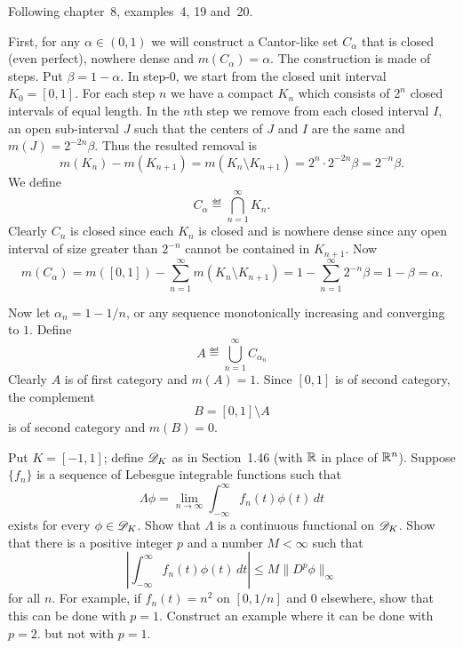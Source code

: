 \begin{enumerate}
Following \cite{Gelb1996} chapter~8, examples~4, 19 and~20.

First, for any \(\alpha\in(0,1)\)
we will construct a Cantor-like set \(C_\alpha\)
that is closed (even perfect), nowhere dense and \(m(C_\alpha)=\alpha\).
The construction is made of steps. 
Put \(\beta = 1 - \alpha\).
In step-$0$, 
we start from the closed unit interval \(K_0 = [0,1]\).
For each step $n$ we have a compact \(K_n\) which 
consists of \(2^n\) closed intervals of equal length.
In the $n$th step we remove from each closed interval $I$,
an open sub-interval $J$ such that the centers of $J$ and $I$ are the same
and \(m(J) = 2^{-2n}\beta\). Thus the resulted removal is
\begin{equation*}
m(K_n) - m(K_{n+1}) = m(K_n \setminus K_{n+1}) 
 = 2^n \cdot 2^{-2n}\beta = 2^{-n}\beta.
\end{equation*}
We define
\begin{equation*}
 C_\alpha \eqdef \bigcap_{n=1}^\infty K_n.
\end{equation*}
Clearly \(C_n\) is closed since each \(K_n\) is closed and is nowhere dense
since any open interval of size greater than \(2^{-n}\) cannot be contained
in \(K_{n+1}\). Now
\begin{equation*}
m(C_\alpha) = m([0,1]) - \sum_{n=1}^\infty m(K_n \setminus K_{n+1}) 
   = 1 - \sum_{n=1}^\infty 2^{-n}\beta = 1 - \beta = \alpha.
\end{equation*}

Now let \(\alpha_n = 1 - 1/n\),
or any sequence monotonically increasing and converging to $1$.
Define
\begin{equation*}
A \eqdef \bigcup_{n=1}^\infty C_{\alpha_n}
\end{equation*}
Clearly $A$ is of first category and \(m(A)=1\). 
Since \([0,1]\) is of second category, the complement 
\begin{equation*}
B = [0,1] \setminus A
\end{equation*}
is of second category and \(m(B) = 0\).


\begin{excopy}
Put \(K=[-1,1]\); define \(\mathscr{D}_K\) as in Section~1.46
(with \(\mathbb{R}\) in place of \(\mathbb{R}^n\)).
Suppose \(\{f_n\}\) is a sequence of Lebesgue integrable functions such that
\begin{equation*}
 \Lambda \phi = \lim_{n\to\infty}\int_{-\infty}^\infty f_n(t)\phi(t)\,dt
\end{equation*}
exists for every \(\phi\in\mathscr{D}_K\).
Show that \(\Lambda\) is a continuous functional on \(\mathscr{D}_K\).
Show that there is a positive integer $p$ and a number \(M<\infty\) such that
\begin{equation*}
 \left| \int_{-\infty}^\infty f_n(t)\phi(t)\,dt\right| \leq M\|D^p\phi\|_\infty
\end{equation*}
for all $n$. For example, if \(f_n(t) = n^2\) on \([0,1/n]\) and $0$ elsewhere,
show that this can be done with \(p=1\).
Construct an example where it can be done with \(p=2\).
but not with \(p=1\).
\end{excopy}


\end{enumerate}
